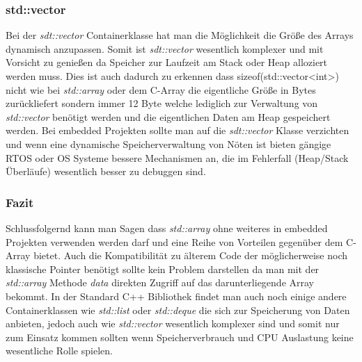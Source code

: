 \documentclass[MES,Master,ngerman]{twbook}%
\begin{document}
\subsubsection{std::vector}
Bei der \textit{sdt::vector} Containerklasse hat man die Möglichkeit die Größe des Arrays dynamisch anzupassen. Somit ist \textit{sdt::vector} wesentlich komplexer und mit Vorsicht zu genießen da Speicher zur Laufzeit am Stack oder Heap alloziert werden muss. Dies ist auch dadurch zu erkennen dass sizeof(std::vector<int>) nicht wie bei \textit{std::array} oder dem C-Array die eigentliche Größe in Bytes zurückliefert sondern immer 12 Byte welche lediglich zur Verwaltung von \textit{std::vector} benötigt werden und die eigentlichen Daten am Heap gespeichert werden. Bei embedded Projekten sollte man auf die \textit{sdt::vector} Klasse verzichten und wenn eine dynamische Speicherverwaltung von Nöten ist bieten gängige RTOS oder OS Systeme bessere Mechanismen an, die im Fehlerfall (Heap/Stack Überläufe) wesentlich besser zu debuggen sind.

\subsubsection{Fazit}
Schlussfolgernd kann man Sagen dass \textit{std::array} ohne weiteres in embedded Projekten verwenden werden darf und eine Reihe von Vorteilen gegenüber dem C-Array bietet. Auch die Kompatibilität zu älterem Code der möglicherweise noch klassische Pointer benötigt sollte kein Problem darstellen da man mit der \textit{std::array} Methode \textit{data} direkten Zugriff auf das darunterliegende Array bekommt. In der Standard C++ Bibliothek findet man auch noch einige andere Containerklassen wie \textit{std::list} oder \textit{std::deque} die sich zur Speicherung von Daten anbieten, jedoch auch wie \textit{std::vector} wesentlich komplexer sind und somit nur zum Einsatz kommen sollten wenn Speicherverbrauch und CPU Auslastung keine wesentliche Rolle spielen.
\newpage
\end{document}

